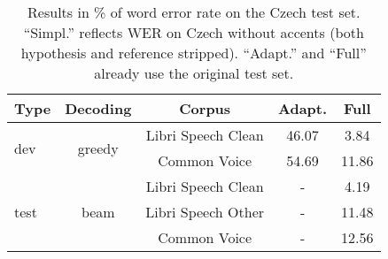 \begin{table}[t]
	\small\centering
	\begin{tabular}{lcc|cc}
		\bf Type & \bf Decoding & \bf Corpus & \bf Adapt. & \bf Full \\
		\hline
		\multirow{2}{*}{dev} & \multirow{2}{*}{greedy} & Libri Speech Clean & 46.07 &   3.84 \\

		&& Common Voice & 54.69 &  11.86 \\
		
		\hline

		\multirow{3}{*}{test} & \multirow{3}{*}{beam} & Libri Speech Clean & - &  4.19  \\
		
		 && Libri Speech Other & - &  11.48  \\

		&& Common Voice & - &  12.56  \\
	\end{tabular}
	\caption{Results in \% of word error rate on the Czech test set. ``Simpl.'' reflects WER on Czech without accents (both hypothesis and reference stripped). ``Adapt.'' and ``Full'' already use the original test set.}
	\label{tab:en_phon_results}
\end{table}